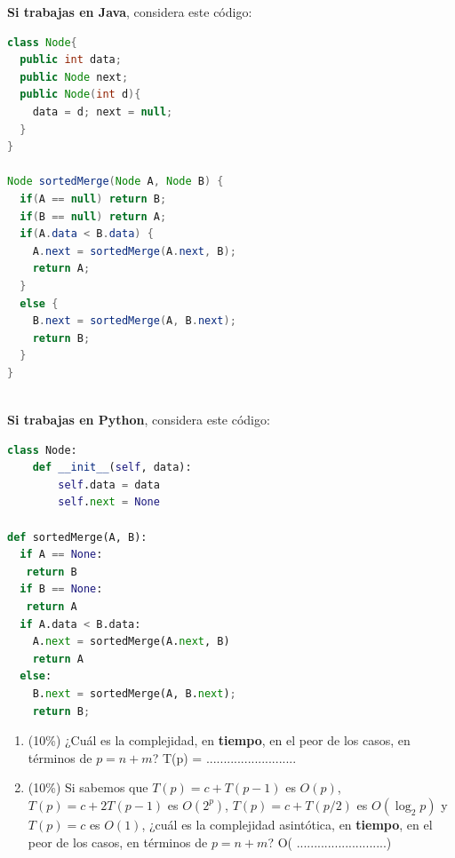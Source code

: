 \documentclass[10 pt]{article}
\begin{document}
\begin{multicols}{2}
\textbf{Si trabajas en Java}, considera este código:

{\footnotesize
\begin{lstlisting}[language=Java]
class Node{
  public int data;
  public Node next;
  public Node(int d){
    data = d; next = null;
  }
}

Node sortedMerge(Node A, Node B) {       
  if(A == null) return B; 
  if(B == null) return A;           
  if(A.data < B.data) { 
    A.next = sortedMerge(A.next, B); 
    return A; 
  } 
  else { 
    B.next = sortedMerge(A, B.next); 
    return B; 
  }         
}
 
\end{lstlisting}
} 

\textbf{Si trabajas en Python}, considera este código:

{\footnotesize
\begin{lstlisting}[language=Python]
class Node: 
    def __init__(self, data): 
        self.data = data 
        self.next = None

def sortedMerge(A, B):
  if A == None:
   return B
  if B == None:
   return A           
  if A.data < B.data: 
    A.next = sortedMerge(A.next, B) 
    return A 
  else:  
    B.next = sortedMerge(A, B.next); 
    return B;       
\end{lstlisting}
}



\begin{enumerate}[label=\Alph*]
	\item (10\%) ¿Cuál es la complejidad, en \textbf{tiempo}, en el peor de los casos, en términos de $p=n+m$? T(p) = ..........................
	
	\item (10\%) Si sabemos que $T(p) = c + T(p-1)$ es $O(p)$, $T(p) = c + 2T(p-1)$ es $O(2^p)$, $T(p) = c + T(p/2)$ es $O(\log_2 p)$ y $T(p) = c$ es $O(1)$, ¿cuál
  es la complejidad asintótica, en \textbf{tiempo}, en el peor de los casos, en términos de $p = n+m$? O( ..........................)
\end{enumerate}




\end{multicols}
\end{document}
